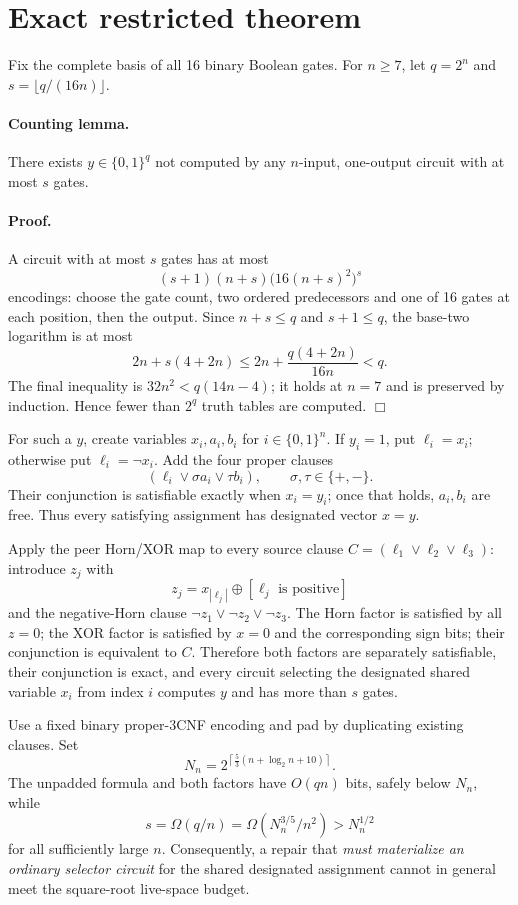\documentclass[11pt]{article}
\begin{document}
\section*{Exact restricted theorem}
Fix the complete basis of all 16 binary Boolean gates.  For $n\geq 7$, let
$q=2^n$ and $s=\lfloor q/(16n)\rfloor$.

\paragraph{Counting lemma.}
There exists $y\in\{0,1\}^q$ not computed by any $n$-input, one-output circuit
with at most $s$ gates.

\paragraph{Proof.}
A circuit with at most $s$ gates has at most
\[
(s+1)(n+s)\bigl(16(n+s)^2\bigr)^s
\]
encodings: choose the gate count, two ordered predecessors and one of 16 gates
at each position, then the output.  Since $n+s\leq q$ and $s+1\leq q$, the
base-two logarithm is at most
\[
2n+s(4+2n)\leq 2n+\frac{q(4+2n)}{16n}<q.
\]
The final inequality is $32n^2<q(14n-4)$; it holds at $n=7$ and is preserved
by induction.  Hence fewer than $2^q$ truth tables are computed. \hfill$\Box$

For such a $y$, create variables $x_i,a_i,b_i$ for $i\in\{0,1\}^n$.  If
$y_i=1$, put $\ell_i=x_i$; otherwise put $\ell_i=\neg x_i$.  Add the four
proper clauses
\[
(\ell_i\vee \sigma a_i\vee \tau b_i),
\qquad \sigma,\tau\in\{+,-\}.
\]
Their conjunction is satisfiable exactly when $x_i=y_i$; once that holds,
$a_i,b_i$ are free.  Thus every satisfying assignment has designated vector
$x=y$.

Apply the peer Horn/XOR map to every source clause
$C=(\ell_1\vee\ell_2\vee\ell_3)$: introduce $z_j$ with
\[
z_j=x_{|\ell_j|}\oplus[\ell_j\text{ is positive}]
\]
and the negative-Horn clause
$\neg z_1\vee\neg z_2\vee\neg z_3$.  The Horn factor is satisfied by all
$z=0$; the XOR factor is satisfied by $x=0$ and the corresponding sign bits;
their conjunction is equivalent to $C$.  Therefore both factors are separately
satisfiable, their conjunction is exact, and every circuit selecting the
designated shared variable $x_i$ from index $i$ computes $y$ and has more than
$s$ gates.

Use a fixed binary proper-3CNF encoding and pad by duplicating existing clauses.
Set
\[
N_n=2^{\left\lceil\frac53(n+\log_2 n+10)\right\rceil}.
\]
The unpadded formula and both factors have $O(qn)$ bits, safely below $N_n$,
while
\[
s=\Omega(q/n)=\Omega(N_n^{3/5}/n^2)>N_n^{1/2}
\]
for all sufficiently large $n$.  Consequently, a repair that \emph{must
materialize an ordinary selector circuit} for the shared designated assignment
cannot in general meet the square-root live-space budget.
\end{document}
